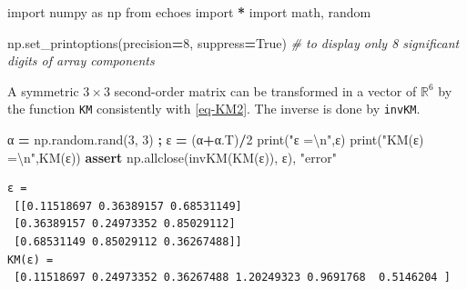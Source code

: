 \documentclass[
  a4paper,
  numbers=noendperiod,
  DIV=12]{scrreprt}
\newenvironment{Shaded}{\begin{snugshade}}{\end{snugshade}}
\newcommand{\BuiltInTok}[1]{#1}
\newcommand{\CharTok}[1]{\textcolor[rgb]{0.31,0.60,0.02}{#1}}
\newcommand{\CommentTok}[1]{\textcolor[rgb]{0.56,0.35,0.01}{\textit{#1}}}
\newcommand{\ControlFlowTok}[1]{\textcolor[rgb]{0.13,0.29,0.53}{\textbf{#1}}}
\newcommand{\DecValTok}[1]{\textcolor[rgb]{0.00,0.00,0.81}{#1}}
\newcommand{\ImportTok}[1]{#1}
\newcommand{\NormalTok}[1]{#1}
\newcommand{\OperatorTok}[1]{\textcolor[rgb]{0.81,0.36,0.00}{\textbf{#1}}}
\newcommand{\StringTok}[1]{\textcolor[rgb]{0.31,0.60,0.02}{#1}}
\newcommand{\VariableTok}[1]{\textcolor[rgb]{0.00,0.00,0.00}{#1}}
\newcommand{\R}{{\mathbb{{R}}}}
\begin{document}
\begin{tcolorbox}[enhanced jigsaw, title={Imports}, left=2mm, titlerule=0mm, colback=white, breakable, colframe=quarto-callout-tip-color-frame, bottomtitle=1mm, toptitle=1mm, rightrule=.15mm, bottomrule=.15mm, coltitle=black, opacitybacktitle=0.6, arc=.35mm, colbacktitle=quarto-callout-tip-color!10!white, leftrule=.75mm, opacityback=0, toprule=.15mm]

\begin{Shaded}
\begin{Highlighting}[]
\ImportTok{import}\NormalTok{ numpy }\ImportTok{as}\NormalTok{ np}
\ImportTok{from}\NormalTok{ echoes }\ImportTok{import} \OperatorTok{*}
\ImportTok{import}\NormalTok{ math, random}

\NormalTok{np.set\_printoptions(precision}\OperatorTok{=}\DecValTok{8}\NormalTok{, suppress}\OperatorTok{=}\VariableTok{True}\NormalTok{)}
\CommentTok{\# to display only 8 significant digits of array components}
\end{Highlighting}
\end{Shaded}

\end{tcolorbox}

A symmetric \(3×3\) second-order matrix can be transformed in a vector
of \(\R^6\) by the function \texttt{KM} consistently with \ref{eq-KM2}.
The inverse is done by \texttt{invKM}.

\begin{Shaded}
\begin{Highlighting}[]
\NormalTok{α }\OperatorTok{=}\NormalTok{ np.random.rand(}\DecValTok{3}\NormalTok{, }\DecValTok{3}\NormalTok{) }\OperatorTok{;}\NormalTok{ ε }\OperatorTok{=}\NormalTok{ (α}\OperatorTok{+}\NormalTok{α.T)}\OperatorTok{/}\DecValTok{2}
\BuiltInTok{print}\NormalTok{(}\StringTok{"ε =}\CharTok{\textbackslash{}n}\StringTok{"}\NormalTok{,ε)}
\BuiltInTok{print}\NormalTok{(}\StringTok{"KM(ε) =}\CharTok{\textbackslash{}n}\StringTok{"}\NormalTok{,KM(ε))}
\ControlFlowTok{assert}\NormalTok{ np.allclose(invKM(KM(ε)), ε), }\StringTok{"error"}
\end{Highlighting}
\end{Shaded}

\begin{verbatim}
ε =
 [[0.11518697 0.36389157 0.68531149]
 [0.36389157 0.24973352 0.85029112]
 [0.68531149 0.85029112 0.36267488]]
KM(ε) =
 [0.11518697 0.24973352 0.36267488 1.20249323 0.9691768  0.5146204 ]
\end{verbatim}
\end{document}
